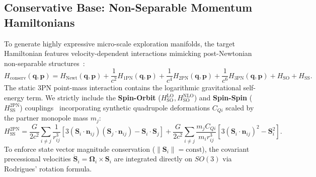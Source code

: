 \documentclass[11pt,a4paper,reqno]{article}
\theoremstyle{plain}
\theoremstyle{definition}
\theoremstyle{remark}
\numberwithin{equation}{section}
\begin{document}
\subsection{Conservative Base: Non-Separable Momentum Hamiltonians}
To generate highly expressive micro-scale exploration manifolds, the target Hamiltonian features velocity-dependent interactions mimicking post-Newtonian non-separable structures~\cite{DamourJaranowskiSchafer2008}:
\begin{equation}
H_{\mathrm{conserv}}(\bm{q}, \bm{p}) = H_{\mathrm{Newt}}(\bm{q}, \bm{p}) + \frac{1}{c^2} H_{\mathrm{1PN}}(\bm{q}, \bm{p}) + \frac{1}{c^4} H_{\mathrm{2PN}}(\bm{q}, \bm{p}) + \frac{1}{c^6} H_{\mathrm{3PN}}(\bm{q}, \bm{p}) + H_{\mathrm{SO}} + H_{\mathrm{SS}}.
\end{equation}
The static 3PN point-mass interaction contains the logarithmic gravitational self-energy term. We strictly include the \textbf{Spin-Orbit} ($H_{\mathrm{SO}}^{\mathrm{LO}}, H_{\mathrm{SO}}^{\mathrm{NLO}}$) and \textbf{Spin-Spin} ($H_{\mathrm{SS}}^{\mathrm{2PN}}$) couplings~\cite{Kidder1995} incorporating synthetic quadrupole deformations $C_{Qi}$ scaled by the partner monopole mass $m_j$:
\begin{equation}
H_{\mathrm{SS}}^{\mathrm{2PN}} = \frac{G}{2 c^2} \sum_{i \neq j} \frac{1}{r_{ij}^3} \left[ 3 (\bm{S}_i \cdot \bm{n}_{ij})(\bm{S}_j \cdot \bm{n}_{ij}) - \bm{S}_i \cdot \bm{S}_j \right] + \frac{G}{2 c^2} \sum_{i \neq j} \frac{m_j C_{Qi}}{m_i r_{ij}^3} \left[ 3 (\bm{S}_i \cdot \bm{n}_{ij})^2 - \bm{S}_i^2 \right].
\end{equation}
To enforce state vector magnitude conservation ($\lVert\bm{S}_i\rVert = \text{const}$), the covariant precessional velocities $\dot{\bm{S}}_i = \bm{\Omega}_i \times \bm{S}_i$ are integrated directly on $SO(3)$ via Rodrigues' rotation formula.
\end{document}
